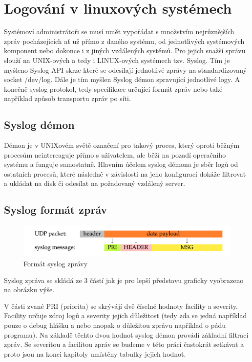 \documentclass[thesis=B,czech]{FITthesis}[2012/06/26]
\begin{document}
\chapter{Logování v linuxových systémech}
Systémoví administrátoři se musí umět vypořádat s množstvím nejrůznějších zpráv pocházejících ať už přímo z daného systému, od jednotlivých systémových komponent nebo dokonce i z jiných vzdálených systémů. Pro jejich snažší správu slouží na UNIX-ových a tedy i LINUX-ových systémech tzv. Syslog. Tím je myšleno Syslog API skrze které se odesílají jednotlivé zprávy na standardizovaný socket /dev/log. Dále je tím myšlen Syslog démon spravující jednotlivé logy. A konečně syslog protokol, tedy specifikace určující formát zpráv nebo také například způsob transportu zpráv po síti.

\section{Syslog démon}
Démon je v UNIXovém světě označení pro takový proces, který oproti běžným procesům neintereaguje přímo s uživatelem, ale běží na pozadí operačního systému a funguje samostatně. Hlavním účelem syslog démona je sběr logů od ostatních procesů, které následně v závislosti na jeho konfiguraci dokáže filtrovat a ukládat na disk či odesílat na požadovaný vzdálený server.

\section{Syslog formát zpráv}
\begin{figure}[H]
	\centering
	\includegraphics[scale=0.3]{images/syslog-message-format}
	\caption[Formát syslog zprávy]{Formát syslog zprávy}
\end{figure}

Syslog zpráva se skládá ze 3 částí jak je pro lepší představu graficky vyobrazeno na obrázku výše.

V části zvané PRI (priorita) se skrývájí dvě číselné hodnoty facility a severity. Facility určuje zdroj logů a severity jejich důležitost (tedy zda se jedná například pouze o debug hlášku a nebo naopak o důležitou zprávu například o pádu programu). Na základě těchto dvou hodnot syslog démon provádí základní filtraci zpráv.  
Se severitou a facilitou zpráv se budeme v této práci častokrát setkávat a proto jsou na konci kapitoly umístěny tabulky jejich hodnot.
\end{document}
